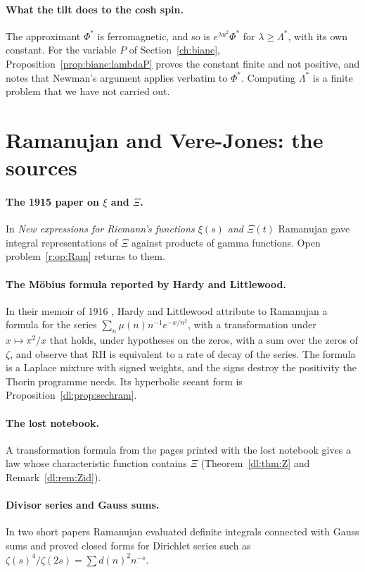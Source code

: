 \paragraph{What the tilt does to the cosh spin.} The approximant $\Phi^*$ is ferromagnetic, and so is $e^{\lambda u^2}\Phi^*$ for $\lambda\ge\Lambda^*$, with its own constant. For the variable $P$ of Section~\ref{ch:biane}, Proposition~\ref{prop:biane:lambdaP} proves the constant finite and not positive, and notes that Newman's argument applies verbatim to $\Phi^*$. Computing $\Lambda^*$ is a finite problem that we have not carried out.

\section{Ramanujan and Vere-Jones: the sources}\label{r:sec:sources}

\paragraph{The 1915 paper on $\xi$ and $\Xi$.} In \emph{New expressions for Riemann's functions $\xi(s)$ and $\Xi(t)$} \cite{Ram15} Ramanujan gave integral representations of $\Xi$ against products of gamma functions. Open problem~\ref{r:op:Ram} returns to them.

\paragraph{The M\"obius formula reported by Hardy and Littlewood.} In their memoir of 1916 \cite{HL16}, Hardy and Littlewood attribute to Ramanujan a formula for the series $\sum_n\mu(n)n^{-1}e^{-x/n^2}$, with a transformation under $x\mapsto\pi^2/x$ that holds, under hypotheses on the zeros, with a sum over the zeros of $\zeta$, and observe that RH is equivalent to a rate of decay of the series. The formula is a Laplace mixture with signed weights, and the signs destroy the positivity the Thorin programme needs. Its hyperbolic secant form is Proposition~\ref{dl:prop:sechram}.


\paragraph{The lost notebook.} A transformation formula from the pages printed with the lost notebook gives a law whose characteristic function contains $\Xi$ (Theorem~\ref{dl:thm:Z} and Remark~\ref{dl:rem:Zid}).

\paragraph{Divisor series and Gauss sums.} In two short papers \cite{RamG,RamF} Ramanujan evaluated definite integrals connected with Gauss sums and proved closed forms for Dirichlet series such as $\zeta(s)^4/\zeta(2s)=\sum d(n)^2n^{-s}$.


